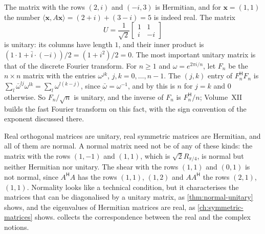 The matrix with the rows $(2,i)$ and $(-i,3)$ is Hermitian, and for $\mathbf x=(1,1)$ the number $\langle\mathbf x,A\mathbf x\rangle=(2+i)+(3-i)=5$ is indeed real. The matrix
\[
U=\frac1{\sqrt2}\begin{bmatrix}1&1\\i&-i\end{bmatrix}
\]
is unitary: its columns have length $1$, and their inner product is $(1\cdot1+\bar i\cdot(-i))/2=(1+i^2)/2=0$. The most important unitary matrix is that of the discrete Fourier transform. For $n\ge1$ and $\omega=e^{2\pi i/n}$, let $F_n$ be the $n\times n$ matrix with the entries $\omega^{jk}$, $j,k=0,\ldots,n-1$. The $(j,k)$ entry of $F_n^{\mathsf H}F_n$ is $\sum_l\bar\omega^{lj}\omega^{lk}=\sum_l\omega^{l(k-j)}$, since $\bar\omega=\omega^{-1}$, and by  this is $n$ for $j=k$ and $0$ otherwise. So $F_n/\sqrt n$ is unitary, and the inverse of $F_n$ is $F_n^{\mathsf H}/n$; Volume~XII builds the fast Fourier transform on this fact, with the sign convention of the exponent discussed there.

Real orthogonal matrices are unitary, real symmetric matrices are Hermitian, and all of them are normal. A normal matrix need not be of any of these kinds: the matrix with the rows $(1,-1)$ and $(1,1)$, which is $\sqrt2R_{\pi/4}$, is normal but neither Hermitian nor unitary. The shear with the rows $(1,1)$ and $(0,1)$ is not normal, since $A^{\mathsf H}A$ has the rows $(1,1)$, $(1,2)$ and $AA^{\mathsf H}$ the rows $(2,1)$, $(1,1)$. Normality looks like a technical condition, but it characterises the matrices that can be diagonalised by a unitary matrix, as \cref{thm:normal-unitary} shows, and the eigenvalues of Hermitian matrices are real, as \cref{ch:symmetric-matrices} shows.  collects the correspondence between the real and the complex notions.

